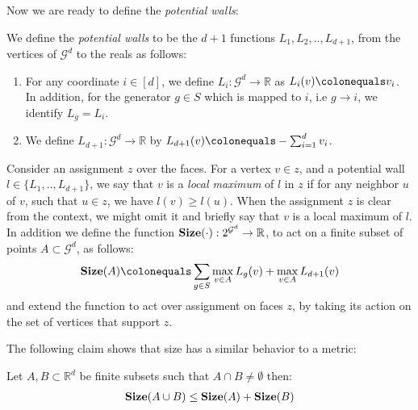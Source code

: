 Now we are ready to define the \textit{potential walls}:
\begin{definition}
  We define the \textit{potential walls} to be the $d+1$ functions $L_{1},L_{2},..,L_{d+1}$, from the vertices of $\mathcal{G}^{d}$ to the reals as follows:
  \begin{enumerate}
    \item For any coordinate $i \in [d]$, we define $L_{i} \colon \mathcal{G}^{d} \rightarrow \mathbb{R}$ as $L_{i}(v) \colonequals v_{i}$. In addition, for the generator $g \in S$ which is mapped to $i$, i.e $g \rightarrow i $, we identify $L_{g} = L_{i}$. 
    \item We define $L_{d+1} \colon \mathcal{G}^{d} \rightarrow \mathbb{R}$ by $L_{d+1}(v) \colonequals -\sum_{i = 1}^{d}v_{i}$.
  \end{enumerate}
  Consider an assignment $z$ over the faces. For a vertex $v \in z$, and a potential wall $l \in \{ L_{1},..,L_{d+1}\} $, we say that $v$ is a \textit{local maximum} of $l$ in $z$ if for any neighbor $u$ of $v$, such that $u \in z$, we have $l(v) \ge l(u)$. When the assignment $z$ is clear from the context, we might omit it and briefly say that $v$ is a local maximum of $l$. In addition we define the function $\mathbf{Size}( \cdot ) : 2^{\mathcal{G}^{d}} \rightarrow \mathbb{R} $, to act on a finite subset of points $A \subset \mathcal{G}^{d}$, as follows:   
  \begin{equation*}
    \begin{split}
      \Size{A} \colonequals \sum_{g \in S}\max_{v \in A}L_{g}(v) + \max_{v \in A}L_{d+1}(v) 
    \end{split}
  \end{equation*}
and extend the function to act over assignment on faces $z$, by taking its action on the set of vertices that support $z$.
\end{definition}
The following claim shows that size has a similar behavior to a metric:
\begin{claim}
  \label{claim:tringinq}
  Let $A,B \subset \mathbb{R}^{d}$ be finite subsets such that $A \cap B \neq \emptyset$ then: 
  \begin{equation*}
    \begin{split}
      \mathbf{Size}(A\cup B) \le \mathbf{Size}(A) + \mathbf{Size}(B)
    \end{split}
  \end{equation*}
\end{claim}

